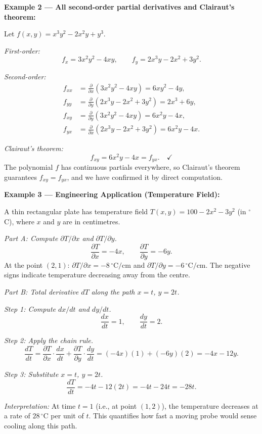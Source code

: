 \documentclass[12pt,a4paper]{article}
\begin{document}
\textbf{Example 2 --- All second-order partial derivatives and Clairaut's theorem:}

Let \(f(x,y) = x^3 y^2 - 2x^2 y + y^3\).

\textit{First-order:}
\[
f_x = 3x^2 y^2 - 4xy, \qquad f_y = 2x^3 y - 2x^2 + 3y^2.
\]

\textit{Second-order:}
\begin{align*}
f_{xx} &= \frac{\partial}{\partial x}(3x^2 y^2 - 4xy) = 6xy^2 - 4y, \\
f_{yy} &= \frac{\partial}{\partial y}(2x^3 y - 2x^2 + 3y^2) = 2x^3 + 6y, \\
f_{xy} &= \frac{\partial}{\partial y}(3x^2 y^2 - 4xy) = 6x^2 y - 4x, \\
f_{yx} &= \frac{\partial}{\partial x}(2x^3 y - 2x^2 + 3y^2) = 6x^2 y - 4x.
\end{align*}

\textit{Clairaut's theorem:}
\[
f_{xy} = 6x^2 y - 4x = f_{yx}. \quad \checkmark
\]
The polynomial \(f\) has continuous partials everywhere, so Clairaut's theorem guarantees \(f_{xy} = f_{yx}\), and we have confirmed it by direct computation.

\bigskip

\textbf{Example 3 --- Engineering Application (Temperature Field):}

A thin rectangular plate has temperature field \(T(x,y) = 100 - 2x^2 - 3y^2\) (in \({}^\circ\)C), where \(x\) and \(y\) are in centimetres.

\textit{Part A: Compute \(\partial T/\partial x\) and \(\partial T/\partial y\).}
\[
\frac{\partial T}{\partial x} = -4x, \qquad \frac{\partial T}{\partial y} = -6y.
\]
At the point \((2, 1)\): \(\partial T/\partial x = -8\,{}^\circ\text{C/cm}\) and \(\partial T/\partial y = -6\,{}^\circ\text{C/cm}\). The negative signs indicate temperature decreasing away from the centre.

\textit{Part B: Total derivative \(dT\) along the path \(x = t\), \(y = 2t\).}

\textit{Step 1: Compute \(dx/dt\) and \(dy/dt\).}
\[
\frac{dx}{dt} = 1, \qquad \frac{dy}{dt} = 2.
\]

\textit{Step 2: Apply the chain rule.}
\[
\frac{dT}{dt} = \frac{\partial T}{\partial x}\cdot\frac{dx}{dt} + \frac{\partial T}{\partial y}\cdot\frac{dy}{dt}
= (-4x)(1) + (-6y)(2) = -4x - 12y.
\]

\textit{Step 3: Substitute \(x=t\), \(y=2t\).}
\[
\frac{dT}{dt} = -4t - 12(2t) = -4t - 24t = -28t.
\]

\textit{Interpretation:} At time \(t=1\) (i.e., at point \((1,2)\)), the temperature decreases at a rate of \(28\,{}^\circ\text{C}\) per unit of \(t\). This quantifies how fast a moving probe would sense cooling along this path.
\end{document}
